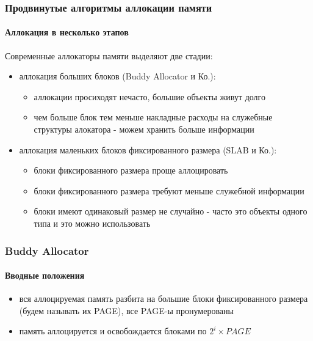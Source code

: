 \begin{frame}
\frametitle{Продвинутые алгоритмы аллокации памяти}
\framesubtitle{Аллокация в несколько этапов}

Современные аллокаторы памяти выделяют две стадии:

\begin{itemize}
  \item<2-> аллокация больших блоков (Buddy Allocator и Ко.):
    \begin{itemize}
      \item аллокации просиходят нечасто, большие объекты живут долго
      \item чем больше блок тем меньше накладные расходы на служебные структуры алокатора - можем хранить больше информации
    \end{itemize}
  \item<3-> аллокация маленьких блоков фиксированного размера (SLAB и Ко.):
    \begin{itemize}
      \item блоки фиксированного размера проще аллоцировать
      \item блоки фиксированного размера требуют меньше служебной информации
      \item блоки имеют одинаковый размер не случайно - часто это объекты одного типа и это можно использовать
    \end{itemize}
\end{itemize}

\end{frame}

\begin{frame}
\frametitle{Buddy Allocator}
\framesubtitle{Вводные положения}

\begin{itemize}
  \item вся аллоцируемая память разбита на большие блоки фиксированного размера (будем называть их PAGE), все PAGE-ы пронумерованы
  \item память аллоцируется и освобождается блоками по $2^i\times PAGE$
\end{itemize}
\end{frame}
